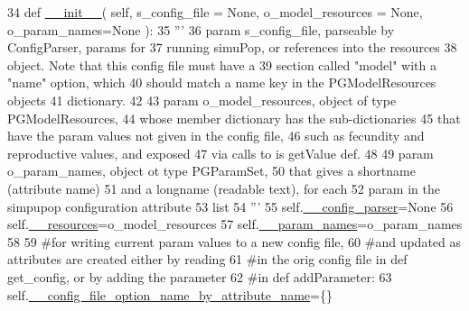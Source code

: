 \begin{DoxyCode}
34     \textcolor{keyword}{def }\hyperlink{classnegui_1_1pginputsimupop_1_1PGInputSimuPop_a1452a83a005c9d30e778b34ae67a399f}{\_\_init\_\_}( self, s\_config\_file = None, o\_model\_resources = None, o\_param\_names=None ):
35         \textcolor{stringliteral}{'''}
36 \textcolor{stringliteral}{        param s\_config\_file, parseable by ConfigParser, params for }
37 \textcolor{stringliteral}{            running simuPop, or references into the resources}
38 \textcolor{stringliteral}{            object.  Note that this config file must have a}
39 \textcolor{stringliteral}{            section called "model" with a "name" option, which}
40 \textcolor{stringliteral}{            should match a name key in the PGModelResources objects}
41 \textcolor{stringliteral}{            dictionary.}
42 \textcolor{stringliteral}{}
43 \textcolor{stringliteral}{        param o\_model\_resources, object of type PGModelResources,}
44 \textcolor{stringliteral}{            whose member dictionary has the sub-dictionaries}
45 \textcolor{stringliteral}{            that have the param values not given in the config file,}
46 \textcolor{stringliteral}{            such as fecundity and reproductive values, and exposed}
47 \textcolor{stringliteral}{            via calls to is getValue def.}
48 \textcolor{stringliteral}{}
49 \textcolor{stringliteral}{        param o\_param\_names, object ot type PGParamSet,}
50 \textcolor{stringliteral}{            that gives a shortname (attribute name)}
51 \textcolor{stringliteral}{            and a longname (readable text), for each }
52 \textcolor{stringliteral}{            param in the simpupop configuration attribute }
53 \textcolor{stringliteral}{            list}
54 \textcolor{stringliteral}{        '''}
55         self.\hyperlink{classnegui_1_1pginputsimupop_1_1PGInputSimuPop_af6628ecaa63a594fc96d1b9273fd1fd6}{\_\_config\_parser}=\textcolor{keywordtype}{None}
56         self.\hyperlink{classnegui_1_1pginputsimupop_1_1PGInputSimuPop_a6c00be5e58b61b239273e04c671cd9e8}{\_\_resources}=o\_model\_resources
57         self.\hyperlink{classnegui_1_1pginputsimupop_1_1PGInputSimuPop_a0a737393cb4d1c66062f9403296c7f19}{\_\_param\_names}=o\_param\_names
58 
59         \textcolor{comment}{#for writing current param values to a new config file,}
60         \textcolor{comment}{#and updated as attributes are created either by reading}
61         \textcolor{comment}{#in the orig config file in def get\_config, or by adding the parameter}
62         \textcolor{comment}{#in def addParameter:}
63         self.\hyperlink{classnegui_1_1pginputsimupop_1_1PGInputSimuPop_a893ab501191e9e1ed89f4f878310d97b}{\_\_config\_file\_option\_name\_by\_attribute\_name}=\{\}      

\end{DoxyCode}

